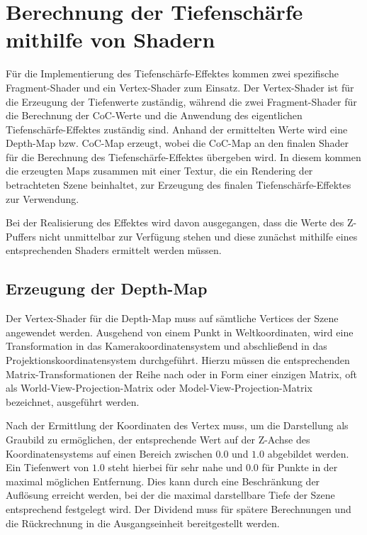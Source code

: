 \documentclass{acmsiggraph}                     %
\begin{document}
\section{Berechnung der Tiefenschärfe mithilfe von Shadern}

Für die Implementierung des Tiefenschärfe-Effektes kommen zwei spezifische Fragment-Shader und ein Vertex-Shader zum Einsatz. Der Vertex-Shader ist für die Erzeugung der Tiefenwerte zuständig, während die zwei Fragment-Shader für die Berechnung der CoC-Werte und die Anwendung des eigentlichen Tiefenschärfe-Effektes zuständig sind. Anhand der ermittelten Werte wird eine Depth-Map bzw. CoC-Map erzeugt, wobei die CoC-Map an den finalen Shader für die Berechnung des Tiefenschärfe-Effektes übergeben wird. In diesem kommen die erzeugten Maps zusammen mit einer Textur, die ein Rendering der betrachteten Szene beinhaltet, zur Erzeugung des finalen Tiefenschärfe-Effektes zur Verwendung.

Bei der Realisierung des Effektes wird davon ausgegangen, dass die Werte des Z-Puffers nicht unmittelbar zur Verfügung stehen und diese zunächst mithilfe eines entsprechenden Shaders ermittelt werden müssen. 

\subsection{Erzeugung der Depth-Map}
\label{sec:depthmap}

Der Vertex-Shader für die Depth-Map muss auf sämtliche Vertices der Szene angewendet werden. Ausgehend von einem Punkt in Weltkoordinaten, wird eine Transformation in das Kamerakoordinatensystem und abschließend in das Projektionskoordinatensystem durchgeführt. Hierzu müssen die entsprechenden Matrix-Transformationen der Reihe nach oder in Form einer einzigen Matrix, oft als World-View-Projection-Matrix oder Model-View-Projection-Matrix bezeichnet, ausgeführt werden.

Nach der Ermittlung der Koordinaten des Vertex muss, um die Darstellung als Graubild zu ermöglichen, der entsprechende Wert auf der Z-Achse des Koordinatensystems auf einen Bereich zwischen $0.0$ und $1.0$ abgebildet werden. Ein Tiefenwert von $1.0$ steht hierbei für sehr nahe und $0.0$ für  Punkte in der maximal möglichen Entfernung. Dies kann durch eine Beschränkung der Auflösung erreicht werden, bei der die maximal darstellbare Tiefe der Szene entsprechend festgelegt wird. Der Dividend muss für spätere Berechnungen und die Rückrechnung in die Ausgangseinheit bereitgestellt werden. 
\end{document}

